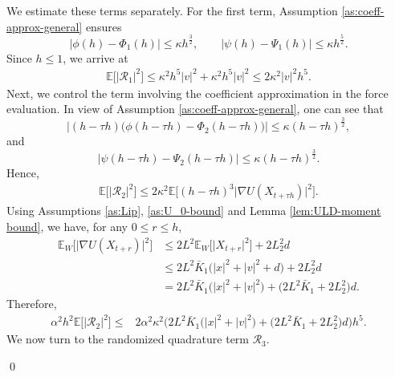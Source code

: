 \documentclass[12pt]{article}
\numberwithin{equation}{section}
\renewenvironment{proof}%
  {\begin{trivlist}%
   \item[]\ignorespaces}%
  {\qed\end{trivlist}}
\begin{document}
\begin{proof}
We estimate these terms separately. 
For the first term, Assumption \ref{as:coeff-approx-general} ensures
\[
|\phi(h)-\Phi_1(h)|
\leq
\kappa h^{\frac{3}{2}},
\qquad
|\psi(h)-\Psi_1(h)|
\leq
\kappa h^{\frac{5}{2}}.
\]
Since \(h\leq1\), we arrive at
\begin{equation}
\label{eq:R1-one-step-estimate}
\begin{aligned}
\mathbb E
\Big[\big|
\mathcal R_1
\big|^2\Big]
\leq
\kappa^2h^5|v|^2
+
\kappa^2h^5|v|^2
\leq
2\kappa^2|v|^2h^5
.
\end{aligned}
\end{equation}
Next, we control the term involving the coefficient approximation in the force evaluation. 
In view of Assumption \ref{as:coeff-approx-general}, one can see that
\[
\big|
(h-\tau h)
\big(
\phi(h-\tau h)-\Phi_2(h-\tau h)
\big)
\big|
\leq
\kappa(h-\tau h)^{\frac{3}{2}},
\]
and
\[
\big|
\psi(h-\tau h)-\Psi_2(h-\tau h)
\big|
\leq
\kappa(h-\tau h)^{\frac{3}{2}}.
\]
Hence,
\begin{equation}
\label{eq:R2-one-step-pre}
\begin{aligned}
\mathbb E
\Big[\big|
\mathcal R_2
\big|^2\Big]
\leq
2\kappa^2
\mathbb E
\Big[
(h-\tau h)^3
\big|
\nabla U(X_{t+\tau h})
\big|^2
\Big].
\end{aligned}
\end{equation}
Using Assumptions \ref{as:Lip}, \ref{as:U_0-bound} and Lemma \ref{lem:ULD-moment bound}, we have, for any \(0\leq r\leq h\),
\begin{equation}
\label{eq:grad-moment-expanded-noG}
\begin{aligned}
\mathbb E_W
\Big[
\big|
\nabla U(X_{t+r})
\big|^2
\Big]
&\leq
2L^2
\mathbb E_W
\Big[
\big|X_{t+r}
\big|^2
\Big]
+
2L_2^2d
\\
&\leq
2L^2\bar K_1
\big(
|x|^2+|v|^2+d
\big)
+
2L_2^2d
\\
&=
2L^2\bar K_1
\big(
|x|^2+|v|^2
\big)
+
\big(
2L^2\bar K_1+2L_2^2
\big)d.
\end{aligned}
\end{equation}
Therefore,
\begin{equation}
\label{eq:R2-one-step-estimate}
\begin{aligned}
\alpha^2h^2
\mathbb E
\Big[\big|
\mathcal R_2
\big|^2\Big]
\leq&
2\alpha^2\kappa^2
\Big(
2L^2\bar K_1
\big(
|x|^2+|v|^2
\big)
+
\big(
2L^2\bar K_1+2L_2^2
\big)d
\Big)
h^5.
\end{aligned}
\end{equation}
%
We now turn to the randomized quadrature term $\mathcal R_3$. 

\end{proof}
\end{document}
